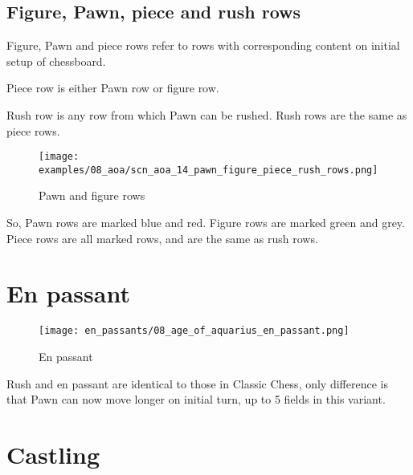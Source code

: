 \subsection*{Figure, Pawn, piece and rush rows}

Figure, Pawn and piece rows refer to rows with corresponding content on initial
setup of chessboard.

Piece row is either Pawn row or figure row.

Rush row is any row from which Pawn can be rushed. Rush rows are the same as
piece rows.

\clearpage %

\noindent
\begin{figure}[h]
\texttt{[image: examples/08\_aoa/scn\_aoa\_14\_pawn\_figure\_piece\_rush\_rows.png]}
\caption{Pawn and figure rows}
\label{fig:scn_aoa_14_pawn_figure_piece_rush_rows}
\end{figure}

So, Pawn rows are marked blue and red. Figure rows are marked green and grey.
Piece rows are all marked rows, and are the same as rush rows.

\clearpage %

\section*{En passant}

\noindent
\begin{wrapfigure}{l}{0.4\textwidth}
\centering
\texttt{[image: en\_passants/08\_age\_of\_aquarius\_en\_passant.png]}
\caption{En passant}
\label{fig:08_age_of_aquarius_en_passant}
\end{wrapfigure}
Rush and en passant are identical to those in Classic Chess, only difference
is that Pawn can now move longer on initial turn, up to 5 fields in this
variant.

\clearpage %

\section*{Castling}

